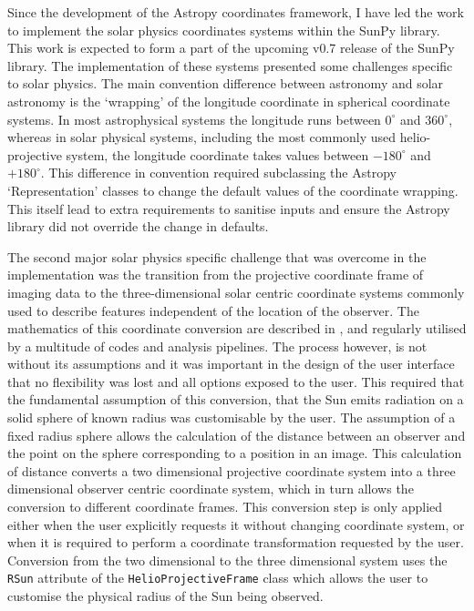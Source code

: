 \documentclass[a4paper,12pt,fourier,authoryear,custommargin]{Classes/PhDThesisPSnPDF}
\begin{document}
Since the development of the Astropy coordinates framework, I have led the work to implement the solar physics coordinates systems within the SunPy library.
This work is expected to form a part of the upcoming v0.7 release of the SunPy library.
The implementation of these systems presented some challenges specific to solar physics.
The main convention difference between astronomy and solar astronomy is the `wrapping' of the longitude coordinate in spherical coordinate systems.
In most astrophysical systems the longitude runs between $0^\circ$ and $360^\circ$, whereas in solar physical systems, including the most commonly used helio-projective system, the longitude coordinate takes values between $-180^\circ$ and $+180^\circ$.
This difference in convention required subclassing the Astropy `Representation' classes to change the default values of the coordinate wrapping.
This itself lead to extra requirements to sanitise inputs and ensure the Astropy library did not override the change in defaults.

The second major solar physics specific challenge that was overcome in the implementation was the transition from the projective coordinate frame of imaging data to the three-dimensional solar centric coordinate systems commonly used to describe features independent of the location of the observer.
The mathematics of this coordinate conversion are described in \cite{thompson2006}, and regularly utilised by a multitude of codes and analysis pipelines.
The process however, is not without its assumptions and it was important in the design of the user interface that no flexibility was lost and all options exposed to the user.
This required that the fundamental assumption of this conversion, that the Sun emits radiation on a solid sphere of known radius was customisable by the user.
The assumption of a fixed radius sphere allows the calculation of the distance between an observer and the point on the sphere corresponding to a position in an image.
This calculation of distance converts a two dimensional projective coordinate system into a three dimensional observer centric coordinate system, which in turn allows the conversion to different coordinate frames.
This conversion step is only applied either when the user explicitly requests it without changing coordinate system, or when it is required to perform a coordinate transformation requested by the user.
Conversion from the two dimensional to the three dimensional system uses the \verb|RSun| attribute of the \verb|HelioProjectiveFrame| class which allows the user to customise the physical radius of the Sun being observed.
\end{document}
